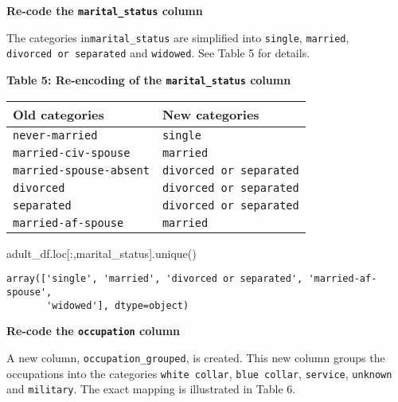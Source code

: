 \documentclass[
  letterpaper,
  DIV=11,
  numbers=noendperiod]{scrartcl}
\newenvironment{Shaded}{\begin{snugshade}}{\end{snugshade}}
\newcommand{\NormalTok}[1]{\textcolor[rgb]{0.00,0.23,0.31}{#1}}
\newcommand{\StringTok}[1]{\textcolor[rgb]{0.13,0.47,0.30}{#1}}
\begin{document}
\textbf{Re-code the \texttt{marital\_status} column}

The categories in\texttt{marital\_status} are simplified into
\texttt{single}, \texttt{married}, \texttt{divorced\ or\ separated} and
\texttt{widowed}. See Table 5 for details.

\textbf{Table 5: Re-encoding of the \texttt{marital\_status} column}

\begin{longtable}[]{@{}ll@{}}
\toprule\noalign{}
Old categories & New categories \\
\midrule\noalign{}
\endhead
\bottomrule\noalign{}
\endlastfoot
\texttt{never-married} & \texttt{single} \\
\texttt{married-civ-spouse} & \texttt{married} \\
\texttt{married-spouse-absent} & \texttt{divorced\ or\ separated} \\
\texttt{divorced} & \texttt{divorced\ or\ separated} \\
\texttt{separated} & \texttt{divorced\ or\ separated} \\
\texttt{married-af-spouse} & \texttt{married} \\
\end{longtable}

\begin{Shaded}
\begin{Highlighting}[]
\NormalTok{adult\_df.loc[:,}\StringTok{\textquotesingle{}marital\_status\textquotesingle{}}\NormalTok{].unique()}
\end{Highlighting}
\end{Shaded}

\begin{verbatim}
array(['single', 'married', 'divorced or separated', 'married-af-spouse',
       'widowed'], dtype=object)
\end{verbatim}

\textbf{Re-code the \texttt{occupation} column}

A new column, \texttt{occupation\_grouped}, is created. This new column
groups the occupations into the categories \texttt{white\ collar},
\texttt{blue\ collar}, \texttt{service}, \texttt{unknown} and
\texttt{military}. The exact mapping is illustrated in Table 6.
\end{document}

